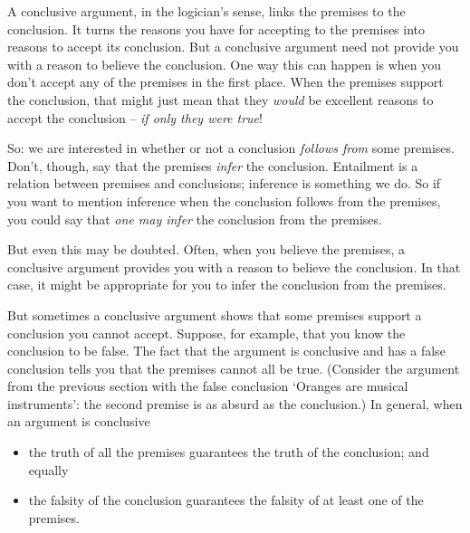 A conclusive argument, in the logician's sense, links the premises to the conclusion. It turns the reasons you have for accepting to the premises into reasons to accept its conclusion. But a conclusive argument need not provide you with a reason to believe the conclusion. One way this can happen is when you don't accept any of the premises in the first place. When the premises support the conclusion, that might just mean that they \emph{would} be excellent reasons to accept the conclusion – \emph{if only they were true}!

So: we are interested in whether or not a conclusion \emph{follows from} some premises. Don't, though, say that the premises \emph{infer} the conclusion. Entailment is a relation between premises and conclusions; inference is something we do. So if you want to mention inference when the conclusion follows from the premises, you could say that \emph{one may infer} the conclusion from the premises.

But even this may be doubted. Often, when you believe the premises, a conclusive argument provides you with a reason to believe the conclusion. In that case, it might be appropriate for you to infer the conclusion from the premises.

But sometimes a conclusive argument shows that some premises support a conclusion you cannot accept. Suppose, for example, that you know the conclusion to be false. The fact that the argument is conclusive and has a false conclusion tells you that the premises cannot all be true. (Consider the argument from the previous section with the false conclusion `Oranges are musical instruments': the second premise is as absurd as the conclusion.) In general, when an argument is conclusive \begin{itemize}
	\item the truth of all the premises guarantees the truth of the conclusion; and equally
	\item the falsity of the conclusion guarantees the falsity of at least one of the premises. 
\end{itemize}


